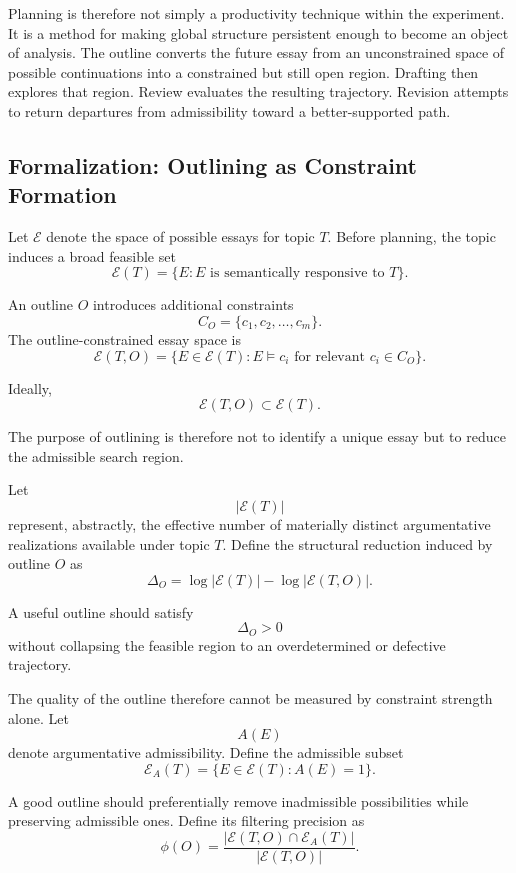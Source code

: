 \documentclass[11pt]{article}
\begin{document}
Planning is therefore not simply a productivity technique within the experiment. It is a method for making global structure persistent enough to become an object of analysis. The outline converts the future essay from an unconstrained space of possible continuations into a constrained but still open region. Drafting then explores that region. Review evaluates the resulting trajectory. Revision attempts to return departures from admissibility toward a better-supported path.

\subsection{Formalization: Outlining as Constraint Formation}

Let \(\mathcal{E}\) denote the space of possible essays for topic \(T\). Before planning, the topic induces a broad feasible set
\[
    \mathcal{E}(T)
    =
    \{E : E\text{ is semantically responsive to }T\}.
\]

An outline \(O\) introduces additional constraints
\[
    C_O
    =
    \{c_1,c_2,\ldots,c_m\}.
\]
The outline-constrained essay space is
\[
    \mathcal{E}(T,O)
    =
    \{E\in\mathcal{E}(T):
    E\models c_i
    \text{ for relevant }c_i\in C_O\}.
\]

Ideally,
\[
    \mathcal{E}(T,O)
    \subset
    \mathcal{E}(T).
\]

The purpose of outlining is therefore not to identify a unique essay but to reduce the admissible search region.

Let
\[
    |\mathcal{E}(T)|
\]
represent, abstractly, the effective number of materially distinct argumentative realizations available under topic \(T\). Define the structural reduction induced by outline \(O\) as
\[
    \Delta_O
    =
    \log |\mathcal{E}(T)|
    -
    \log |\mathcal{E}(T,O)|.
\]

A useful outline should satisfy
\[
    \Delta_O>0
\]
without collapsing the feasible region to an overdetermined or defective trajectory.

The quality of the outline therefore cannot be measured by constraint strength alone. Let
\[
    A(E)
\]
denote argumentative admissibility. Define the admissible subset
\[
    \mathcal{E}_A(T)
    =
    \{E\in\mathcal{E}(T):A(E)=1\}.
\]

A good outline should preferentially remove inadmissible possibilities while preserving admissible ones. Define its filtering precision as
\[
    \phi(O)
    =
    \frac{
        |\mathcal{E}(T,O)\cap\mathcal{E}_A(T)|
    }{
        |\mathcal{E}(T,O)|
    }.
\]
\end{document}

